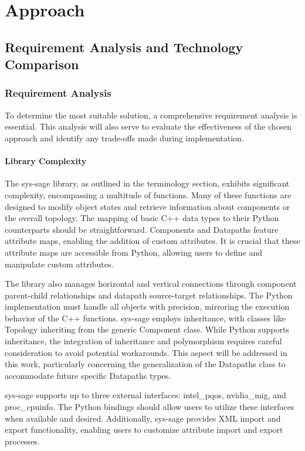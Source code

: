 \chapter{Approach}\label{chapter:Approach}
\section{Requirement Analysis and Technology Comparison}

\subsection{Requirement Analysis}

To determine the most suitable solution, a comprehensive requirement analysis is essential. This analysis will also serve to evaluate the effectiveness of the chosen approach and identify any trade-offs made during implementation.

\subsubsection{Library Complexity}

The sys-sage library, as outlined in the terminology section, exhibits significant complexity, encompassing a multitude of functions. Many of these functions are designed to modify object states and retrieve information about components or the overall topology. The mapping of basic C++ data types to their Python counterparts should be straightforward. Components and Datapaths feature attribute maps, enabling the addition of custom attributes. It is crucial that these attribute maps are accessible from Python, allowing users to define and manipulate custom attributes.

The library also manages horizontal and vertical connections through component parent-child relationships and datapath source-target relationships. The Python implementation must handle all objects with precision, mirroring the execution behavior of the C++ functions. sys-sage employs inheritance, with classes like Topology inheriting from the generic Component class. While Python supports inheritance, the integration of inheritance and polymorphism requires careful consideration to avoid potential workarounds. This aspect will be addressed in this work, particularly concerning the generalization of the Datapaths class to accommodate future specific Datapaths types.

sys-sage supports up to three external interfaces: intel\_pqos, nvidia\_mig, and proc\_cpuinfo. The Python bindings should allow users to utilize these interfaces when available and desired. Additionally, sys-sage provides XML import and export functionality, enabling users to customize attribute import and export processes.

